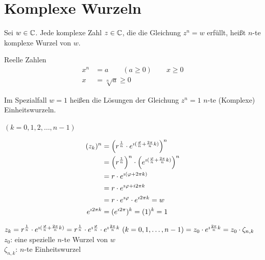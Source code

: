 \clearpage
\section{Komplexe Wurzeln}

\Def Sei $w\in\mathbb{C}$. Jede komplexe Zahl $z \in \mathbb{C}$, die die Gleichung $z^n=w$ erfüllt, heißt $n$-te komplexe Wurzel von $w$.

Reelle Zahlen
\begin{align*}
x^n &= a\qquad(a\geq 0)\qquad x\geq 0\\
x&=\sqrt[n]{a}\geq0
\end{align*}


Im Spezialfall $w=1$ heißen die Lösungen der Gleichung $z^n=1$ $n$-te (Komplexe) Einheitswurzeln.

\qquad $(k = 0,1,2,\ldots, n-1)$

\Beweis \quad
\begin{align*}
(z_k)^n &= \left(r^{\frac{1}{n}}\cdot e^{\imath (\frac{\varphi}{n}+\frac{2\pi}{n}k)}\right)^n\\
&= \left(r^{\frac{1}{n}}\right)^n\cdot \left(e^{\imath (\frac{\varphi}{n}+\frac{2\pi}{n}k)}\right)^n\\
&= r\cdot e^{\imath (\varphi+2\pi k)}\\
&= r\cdot e^{\imath \varphi+i2\pi k}\\
&=r\cdot e^{\imath \varphi}\cdot e^{\imath 2\pi k} =w\\
e^{\imath 2\pi k} &= (e^{\imath 2\pi})^k = (1)^k =1
\end{align*}
 
\Bem $z_k = r^{\frac{1}{n}}\cdot e^{\imath (\frac{\varphi}{n}+\frac{2\pi}{n}k)}\\
 = r^{\frac{1}{n}}\cdot e^{\imath \frac{\varphi}{n}}\cdot e^{\imath \frac{2\pi}{n}k}\ (k=0,1,\ldots,n-1)\\
 = z_0\cdot e^{\imath \frac{2\pi}{n}k}\\
 = z_0\cdot \zeta_{n,k}\\
 $
 \\
$z_0$: eine spezielle $n$-te Wurzel von $w$ \\
$\zeta_{n,k}$: $n$-te Einheitswurzel

